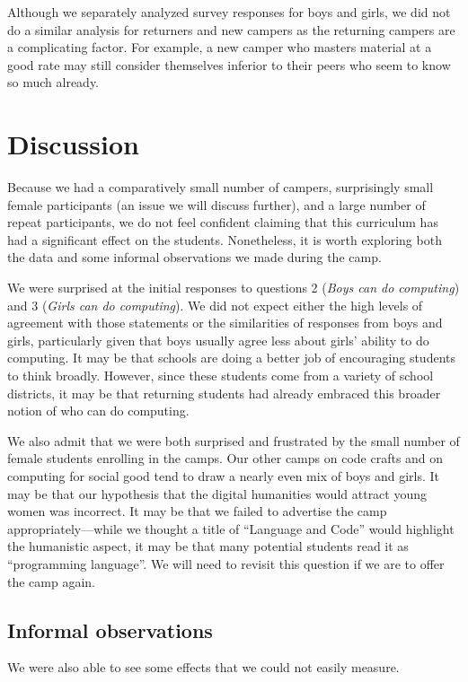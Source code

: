 Although we separately analyzed survey responses for boys and girls,
we did not do a similar analysis for returners and new campers as
the returning campers are a complicating factor.  For example, a
new camper who masters material at a good rate may still consider
themselves inferior to their peers who seem to know so much already.

\section{Discussion}

Because we had a comparatively small number of campers, surprisingly
small female participants (an issue we will discuss further), and
a large number of repeat participants, we do not feel confident
claiming that this curriculum has had a significant effect on the
students.  Nonetheless, it is worth exploring both the data and
some informal observations we made during the camp.

We were surprised at the initial responses to questions 2 (\textit{Boys
can do computing}) and 3 (\textit{Girls can do computing}).  We did
not expect either the high levels of agreement with those statements
or the similarities of responses from boys and girls, particularly
given that boys usually agree less about girls' ability to do
computing.  It may be that schools are doing a better job of
encouraging students to think broadly.  However, since these students
come from a variety of school districts, it may be that returning
students had already embraced this broader notion of who can do
computing.

We also admit that we were both surprised and frustrated by the
small number of female students enrolling in the camps.  Our other
camps on code crafts and on computing for social good tend to draw
a nearly even mix of boys and girls.  It may be that our hypothesis
that the digital humanities would attract young women was incorrect.
It may be that we failed to advertise the camp appropriately---while
we thought a title of ``Language and Code'' would highlight the
humanistic aspect, it may be that many potential students read it
as ``programming language''.  We will need to revisit this question
if we are to offer the camp again.

\subsection{Informal observations}

We were also able to see some effects that we could not easily measure.


